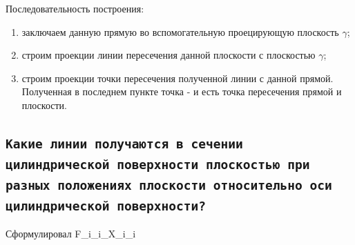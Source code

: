 Последовательность построения:
\begin{enumerate}
    \item заключаем данную прямую во вспомогательную проецирующую плоскость $\gamma$;
    \item строим проекции линии пересечения данной плоскости с плоскостью $\gamma$;
    \item строим проекции точки пересечения полученной линии с данной прямой.
Полученная в последнем пункте точка - и есть точка пересечения прямой и плоскости.
\end{enumerate}



\subsection{}



\newpage
\subsection{\texttt{Какие линии получаются в сечении цилиндрической поверхности плоскостью при разных положениях плоскости относительно оси цилиндрической поверхности?}}
\begin{myquote}
    \centering Сформулировал F\_i\_i\_X\_i\_i
\end{myquote}

